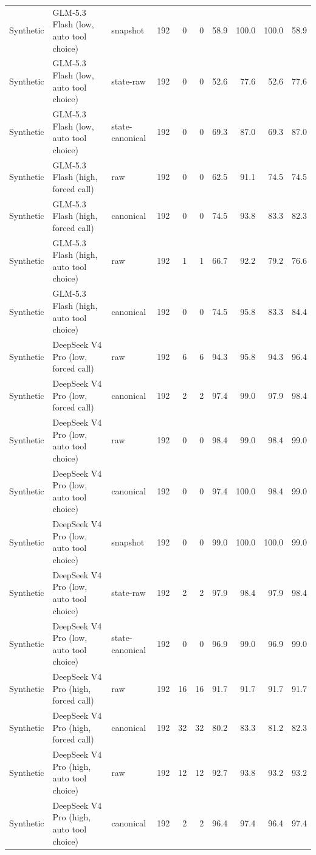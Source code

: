 {\begin{longtable}{lllrrrrrrr}
Synthetic & GLM-5.3 Flash (low, auto tool choice) & snapshot & 192 & 0 & 0 & 58.9 & 100.0 & 100.0 & 58.9 \\
Synthetic & GLM-5.3 Flash (low, auto tool choice) & state-raw & 192 & 0 & 0 & 52.6 & 77.6 & 52.6 & 77.6 \\
Synthetic & GLM-5.3 Flash (low, auto tool choice) & state-canonical & 192 & 0 & 0 & 69.3 & 87.0 & 69.3 & 87.0 \\
Synthetic & GLM-5.3 Flash (high, forced call) & raw & 192 & 0 & 0 & 62.5 & 91.1 & 74.5 & 74.5 \\
Synthetic & GLM-5.3 Flash (high, forced call) & canonical & 192 & 0 & 0 & 74.5 & 93.8 & 83.3 & 82.3 \\
Synthetic & GLM-5.3 Flash (high, auto tool choice) & raw & 192 & 1 & 1 & 66.7 & 92.2 & 79.2 & 76.6 \\
Synthetic & GLM-5.3 Flash (high, auto tool choice) & canonical & 192 & 0 & 0 & 74.5 & 95.8 & 83.3 & 84.4 \\
Synthetic & DeepSeek V4 Pro (low, forced call) & raw & 192 & 6 & 6 & 94.3 & 95.8 & 94.3 & 96.4 \\
Synthetic & DeepSeek V4 Pro (low, forced call) & canonical & 192 & 2 & 2 & 97.4 & 99.0 & 97.9 & 98.4 \\
Synthetic & DeepSeek V4 Pro (low, auto tool choice) & raw & 192 & 0 & 0 & 98.4 & 99.0 & 98.4 & 99.0 \\
Synthetic & DeepSeek V4 Pro (low, auto tool choice) & canonical & 192 & 0 & 0 & 97.4 & 100.0 & 98.4 & 99.0 \\
Synthetic & DeepSeek V4 Pro (low, auto tool choice) & snapshot & 192 & 0 & 0 & 99.0 & 100.0 & 100.0 & 99.0 \\
Synthetic & DeepSeek V4 Pro (low, auto tool choice) & state-raw & 192 & 2 & 2 & 97.9 & 98.4 & 97.9 & 98.4 \\
Synthetic & DeepSeek V4 Pro (low, auto tool choice) & state-canonical & 192 & 0 & 0 & 96.9 & 99.0 & 96.9 & 99.0 \\
Synthetic & DeepSeek V4 Pro (high, forced call) & raw & 192 & 16 & 16 & 91.7 & 91.7 & 91.7 & 91.7 \\
Synthetic & DeepSeek V4 Pro (high, forced call) & canonical & 192 & 32 & 32 & 80.2 & 83.3 & 81.2 & 82.3 \\
Synthetic & DeepSeek V4 Pro (high, auto tool choice) & raw & 192 & 12 & 12 & 92.7 & 93.8 & 93.2 & 93.2 \\
Synthetic & DeepSeek V4 Pro (high, auto tool choice) & canonical & 192 & 2 & 2 & 96.4 & 97.4 & 96.4 & 97.4 \\

\end{longtable}}
